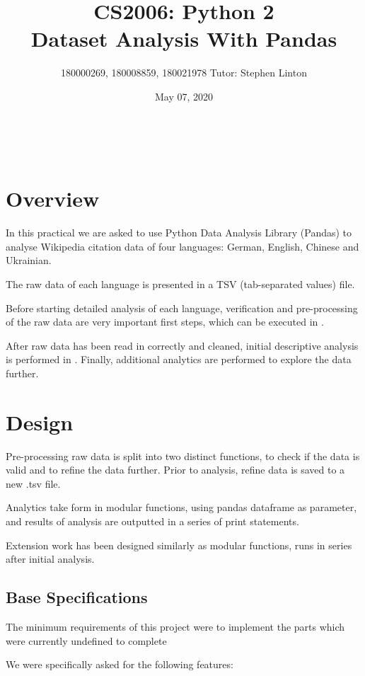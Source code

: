 \documentclass[12pt,a4paper,final]{article}
\begin{document}
\title{%
    CS2006: Python 2 \\
    \Large Dataset Analysis With Pandas} \\
\author{180000269, 180008859, 180021978 Tutor: Stephen Linton}
\date{May 07, 2020}
\maketitle

\section*{Overview}
In this practical we are asked to use Python Data Analysis Library (Pandas) to analyse Wikipedia citation data of four languages: German, English, Chinese and Ukrainian.

The raw data of each language is presented in a TSV (tab-separated values) file.

Before starting detailed analysis of each language, verification and pre-processing of the raw data are very important first steps, which can be executed in .

After raw data has been read in correctly and cleaned, initial descriptive analysis is performed in . Finally, additional analytics are performed to explore the data further.

\section*{Design}
Pre-processing raw data is split into two distinct functions,  to check if the data is valid and  to refine the data further.
Prior to analysis, refine data is saved to a new .tsv file. 

Analytics take form in modular functions, using pandas dataframe as parameter, and results of analysis are outputted in a series of print statements.

Extension work has been designed similarly as modular functions, runs in series after initial analysis.

\subsection*{Base Specifications}

The minimum requirements of this project were to implement the parts which were currently undefined
to complete

We were specifically asked for the following features:
\end{document}
